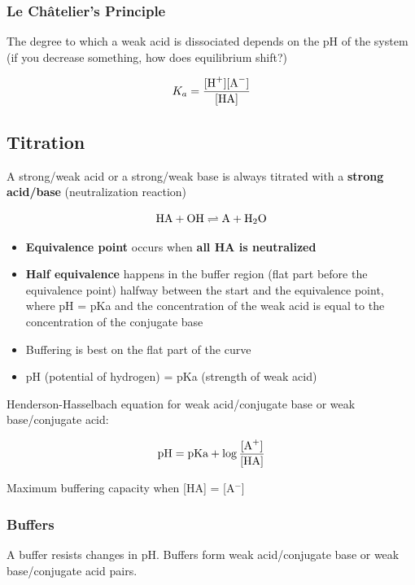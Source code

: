 \documentclass[letterpaper, 12pt]{article}
\begin{document}
\subsubsection*{Le Châtelier's Principle}

The degree to which a weak acid is dissociated depends on the pH of the system (if you decrease something, how does equilibrium shift?)

\begin{equation}
K_a = \frac{[\ce{H+}] [\ce{A-}]} {[\ce{HA}]}
\end{equation}

\subsection*{Titration}

A strong/weak acid or a strong/weak base is always titrated with a \textbf{strong acid/base} (neutralization reaction)

$$ \ce{HA} + \ce{OH} \rightleftharpoons \ce{A} + \ce{H2O} $$

\begin{itemize}
\item \textbf{Equivalence point} occurs when \textbf{all HA is neutralized}

\item \textbf{Half equivalence} happens in the buffer region (flat part before the equivalence point) halfway between the start and the equivalence point, where pH = pKa and the concentration of the weak acid is equal to the concentration of the conjugate base

\item Buffering is best on the flat part of the curve

\item pH (potential of hydrogen) = pKa (strength of weak acid)

\end{itemize}

Henderson-Hasselbach equation for weak acid/conjugate base or weak base/conjugate acid:

\begin{equation}
\text{pH} = \text{pKa} + \log \frac{[\ce{A+}]}{[\ce{HA}]}
\end{equation}

Maximum buffering capacity when [HA] = [A$^-$]

\subsubsection*{Buffers}
A buffer resists changes in pH. Buffers form weak acid/conjugate base or weak base/conjugate acid pairs.
\end{document}
